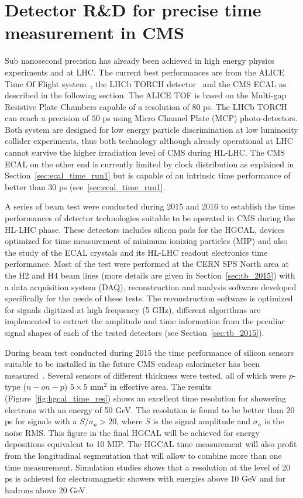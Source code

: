 \section{Detector R\&D for precise time measurement in CMS}
Sub nanosecond precision has already been achieved in high energy physics experiments and at LHC.
The current best performances are from the ALICE Time Of Flight system~\cite{alice_tof}, the LHCb TORCH
detector~\cite{lhcb_torch} and the CMS ECAL as described in the following section. The ALICE TOF is
based on the Multi-gap Resistive Plate Chambers capable of a resolution of $80$ ps. The LHCb TORCH
can reach a precision of $50$ ps using Micro Channel Plate (MCP) photo-detectors. Both system are
designed for low energy particle discrimination at low luminosity collider experiments, thus both technology
although already operational at LHC cannot survive the higher irradiation level of CMS during HL-LHC.
The CMS ECAL on the other end is currently limited by clock distribution as explained in Section~\ref{sec:ecal_time_run1}
but is capable of an intrinsic time performance of better than $30$ ps (see~\ref{sec:ecal_time_run1}.

A series of beam test were conducted during 2015 and 2016 to establish the time performances of detector
technologies suitable to be operated in CMS during the HL-LHC phase. These detectors includes silicon
pads for the HGCAL, devices optimized for time measurement of minimum ionizing particles (MIP) and also the study of
the ECAL \PbWO crystals and its HL-LHC readout electronics time performance. Most of the test were performed at
the CERN SPS North area at the H2 and H4 beam lines (more details are given in Section~\ref{sec:tb_2015}) with
a data acquisition system (DAQ), reconstruction and analysis software developed specifically for the needs of
these tests. The reconstruction software is optimized for signals digitized at high frequency (5 GHz),
different algorithms are implemented to extract the amplitude and time information from the peculiar signal shapes of
each of the tested detectors (see Section~\ref{sec:tb_2015}).

During beam test conducted during 2015 the time performance of silicon sensors suitable to be installed
in the future CMS endcap calorimeter has been measured~\cite{hgcal_tb_time}. Several sensors of different
thickness were tested, all of which were $p$-type ($n-on-p$) $5\times 5$ mm$^2$ in effective area.
The results (Figure~\ref{fig:hgcal_time_res}) shows an excellent time resolution for showering electrons with an
energy of 50 GeV. The resolution is found to be better than 20 ps for signals with a $S/\sigma_n > 20$,  where
$S$ is the signal amplitude and $\sigma_n$ is the noise RMS. This figure in the final HGCAL will be achieved for
energy depositions equivalent to 10 MIP. The HGCAL time measurement will also profit from the longitudinal segmentation that will
allow to combine more than one time measurement. Simulation studies shows that a resolution at the level of 20 ps is
achieved for electromagnetic showers with energies above 10 GeV and for hadrons above 20 GeV.

